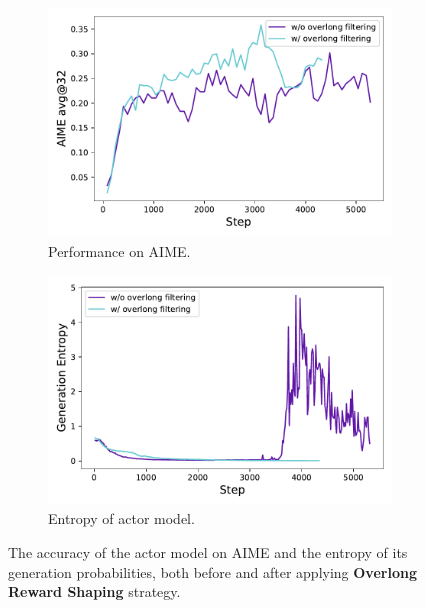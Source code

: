 \begin{figure}[t]
    \centering
    \begin{subfigure}{0.49\textwidth}
        \centering
        \includegraphics[width=\textwidth]{figures/3.4.1.pdf}
        \caption{Performance on AIME.}
        \label{fig:overlong_acc}
    \end{subfigure}
    \hfill
    \begin{subfigure}{0.49\textwidth}
        \centering
        \includegraphics[width=\textwidth]{figures/3.4.2.pdf}
        \caption{Entropy of actor model.}
        \label{fig:overlong_entropy}
    \end{subfigure}
    \caption{The accuracy of the actor model on AIME and the entropy of its generation probabilities, both before and after applying \textbf{Overlong Reward Shaping} strategy.}
    \label{fig:overlong_shaping}
\end{figure}

